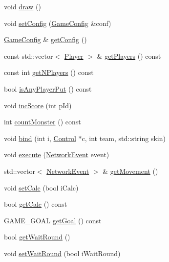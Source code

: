 \begin{DoxyCompactItemize}
void \hyperlink{class_game_table_a73190cc97fe6a3a3091433b205b470b2}{draw} ()
\item 
void \hyperlink{class_game_table_ab7b910524953383dd7038a389b0e5d51}{set\-Config} (\hyperlink{class_game_config}{Game\-Config} \&conf)
\item 
\hyperlink{class_game_config}{Game\-Config} \& \hyperlink{class_game_table_a3fe1e86315247151837f2df404329390}{get\-Config} ()
\item 
const std\-::vector$<$ \hyperlink{class_player}{Player} $>$ \& \hyperlink{class_game_table_ad5cf494f1d7d552807b571fa64bd917a}{get\-Players} () const 
\item 
const int \hyperlink{class_game_table_a0f12dc7e75a2358cc1ab88a407bf5042}{get\-N\-Players} () const 
\item 
bool \hyperlink{class_game_table_a0c830892ac64a23447a122de268357e0}{is\-Any\-Player\-Put} () const 
\item 
void \hyperlink{class_game_table_a168991df1df26c1f5a6f468910191b0d}{inc\-Score} (int p\-Id)
\item 
int \hyperlink{class_game_table_a006ac9866c9df6e59013076f31acb189}{count\-Monster} () const 
\item 
void \hyperlink{class_game_table_a5e4fb4d69f728df47a7c356fe0f9ec6b}{bind} (int i, \hyperlink{class_control}{Control} $\ast$c, int team, std\-::string skin)
\item 
void \hyperlink{class_game_table_a433175e6bb790a958d0061008512bd06}{execute} (\hyperlink{class_network_event}{Network\-Event} event)
\item 
std\-::vector$<$ \hyperlink{class_network_event}{Network\-Event} $>$ \& \hyperlink{class_game_table_aecff76fefb2d7da83ab9d9172645e764}{get\-Movement} ()
\item 
void \hyperlink{class_game_table_ac7d982938712ac3a96d8e4e5b14861e3}{set\-Calc} (bool i\-Calc)
\item 
bool \hyperlink{class_game_table_a83287376ac843c8ab8c0836ef3b366bb}{get\-Calc} () const 
\item 
G\-A\-M\-E\-\_\-\-G\-O\-A\-L \hyperlink{class_game_table_ac39323a670d7a25028acf4d0bbbf61fe}{get\-Goal} () const 
\item 
bool \hyperlink{class_game_table_a149298d7d55d483045f09281e2e491e9}{get\-Wait\-Round} ()
\item 
void \hyperlink{class_game_table_a6c5bb6acd3769d8a06286093ad58abb1}{set\-Wait\-Round} (bool i\-Wait\-Round)
\end{DoxyCompactItemize}


